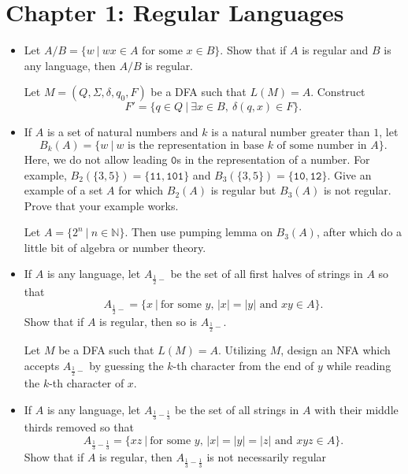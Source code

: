 \section{Chapter 1: Regular Languages}

\begin{itemize}
	
	
	\item[\hard 1.45]
	Let $A/B = \{w \ | \ wx \in A \text{ for some } x \in B \}$. Show that if $A$ is regular and $B$ is any language, then $A/B$ is regular. 
	
	\hint
	Let $M = (Q, \Sigma, \delta, q_0, F)$ be a DFA such that $L(M) = A$. Construct
	\[
		F' = \{ q \in Q \ | \ \exists x \in B,\ \delta(q, x) \in F \}.
	\]
	
	
	\item[\hard 1.56]
	If $A$ is a set of natural numbers and $k$ is a natural number greater than $1$, let
	\[
		B_k(A) = \{ w \ | \ w \text{ is the representation in base $k$ of some number in $A$} \}.
	\]
	Here, we do not allow leading $\mathtt{0}$s in the representation of a number. For example, $B_2(\{3, 5\}) = \{ \mathtt{11}, \mathtt{101} \}$ and $B_3(\{3, 5\}) = \{ \mathtt{10}, \mathtt{12} \}$. Give an example of a set $A$ for which $B_2(A)$ is regular but $B_3(A)$ is not regular. Prove that your example works.
	
	\hint
	Let $A = \{2^n \ | \ n \in \mathbb{N} \}$. Then use pumping lemma on $B_3(A)$, after which do a little bit of algebra or number theory.
	
	
	\item[\hard 1.57] 
	If $A$ is any language, let $A_{\frac{1}{2}-}$ be the set of all first halves of strings in $A$ so that
	\[
		A_{\frac{1}{2}-} = \{ x \ | \ \text{for some $y$, $|x| = |y|$ and $xy \in A$} \}.
	\]
	Show that if $A$ is regular, then so is $A_{\frac{1}{2}-}$.
	
	\hint
	Let $M$ be a DFA such that $L(M) = A$. Utilizing $M$, design an NFA which accepts $A_{\frac{1}{2}-}$ by guessing the $k$-th character from the end of $y$ while reading the $k$-th character of $x$.
	
	
	\item[\hard 1.58] 
	If $A$ is any language, let $A_{\frac{1}{3}-\frac{1}{3}}$ be the set of all strings in $A$ with their middle thirds removed so that	
	\[
		A_{\frac{1}{3}-\frac{1}{3}} = \{ xz \ | \ \text{for some $y$, $|x| = |y| = |z|$ and $xyz \in A$} \}.
	\]
	Show that if $A$ is regular, then $A_{\frac{1}{3}-\frac{1}{3}}$ is not necessarily regular
	

\end{itemize}
